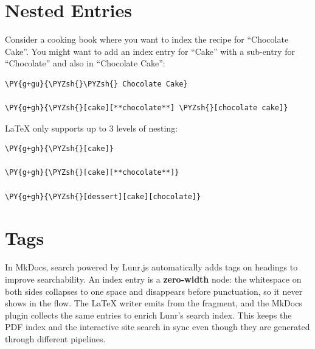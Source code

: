 \documentclass[a4paper,twoside]{article}
\begin{document}
\section{Nested Entries}
Consider a cooking book where you want to index the recipe for \enquote{Chocolate Cake}. You might want to add
an index entry for \enquote{Cake} with a sub-entry for \enquote{Chocolate} and also in \enquote{Chocolate Cake}:
\begin{tscode}[lang=md, engine=pygments]
\begin{Verbatim}[commandchars=\\\{\},breaklines, breakanywhere, commandchars=\\\{\}]
\PY{g+gu}{\PYZsh{}\PYZsh{} Chocolate Cake}

\PY{g+gh}{\PYZsh{}[cake][**chocolate**] \PYZsh{}[chocolate cake]}
\end{Verbatim}
\end{tscode}
\LaTeX{} only supports up to 3 levels of nesting:
\begin{tscode}[lang=md, engine=pygments]
\begin{Verbatim}[commandchars=\\\{\},breaklines, breakanywhere, commandchars=\\\{\}]
\PY{g+gh}{\PYZsh{}[cake]}

\PY{g+gh}{\PYZsh{}[cake][**chocolate**]}

\PY{g+gh}{\PYZsh{}[dessert][cake][chocolate]}
\end{Verbatim}
\end{tscode}
\section{Tags}
In MkDocs, search powered by Lunr.js automatically adds tags on headings to
improve searchability. An index entry is a \textbf{zero-width} node: the whitespace
on both sides collapses to one space and disappears before punctuation, so it
never shows in the flow. The \LaTeX{} writer emits  from the  fragment, and the MkDocs plugin
collects the same entries to enrich Lunr's search index. This keeps the PDF
index and the interactive site search in sync even though they are generated
through different pipelines.
\end{document}
